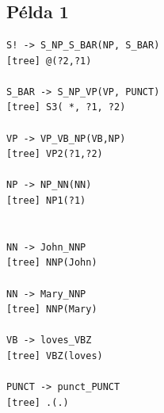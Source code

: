\appendix
\chapter*{\fuggelek}
\setcounter{chapter}{\appendixnumber}



\section{Példa 1}
\label{sec:example1}

\begin{verbatim}
S! -> S_NP_S_BAR(NP, S_BAR)
[tree] @(?2,?1)

S_BAR -> S_NP_VP(VP, PUNCT)
[tree] S3( *, ?1, ?2)

VP -> VP_VB_NP(VB,NP)
[tree] VP2(?1,?2)

NP -> NP_NN(NN)
[tree] NP1(?1)


NN -> John_NNP
[tree] NNP(John)

NN -> Mary_NNP
[tree] NNP(Mary)

VB -> loves_VBZ
[tree] VBZ(loves)

PUNCT -> punct_PUNCT
[tree] .(.)
\end{verbatim}

